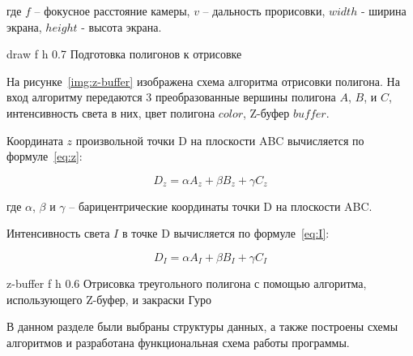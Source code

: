 \noindent где $f$ -- фокусное расстояние камеры, $v$ -- дальность прорисовки, $width$ - ширина экрана, $height$ - высота экрана.

\FloatBarrier
{}
{draw} %
{f} %
{h} %
{0.7\textwidth} %
{Подготовка полигонов к отрисовке} %
\FloatBarrier


На рисунке~\ref{img:z-buffer} изображена схема алгоритма отрисовки полигона. На вход алгоритму передаются 3 преобразованные вершины полигона $A$, $B$, и $C$, интенсивность света в них, цвет полигона $color$, Z-буфер $buffer$.

Координата $z$ произвольной точки D на плоскости ABC вычисляется по формуле~\ref{eq:z}:

\begin{equation}
	\label{eq:z}
	D_z = \alpha A_z + \beta B_z + \gamma C_z
\end{equation}

\noindent где $\alpha$, $\beta$ и $\gamma$ -- барицентрические координаты точки D на плоскости ABC.

Интенсивность света $I$ в точке D вычисляется по формуле~\ref{eq:I}:

\begin{equation}
	\label{eq:I}
	D_I = \alpha A_I + \beta B_I + \gamma C_I
\end{equation}

\FloatBarrier
{}
{z-buffer} %
{f} %
{h} %
{0.6\textwidth} %
{Отрисовка треугольного полигона с помощью алгоритма, использующего Z-буфер, и закраски Гуро} %
\FloatBarrier


В данном разделе были выбраны структуры данных, а также построены схемы алгоритмов и разработана функциональная схема работы программы.

